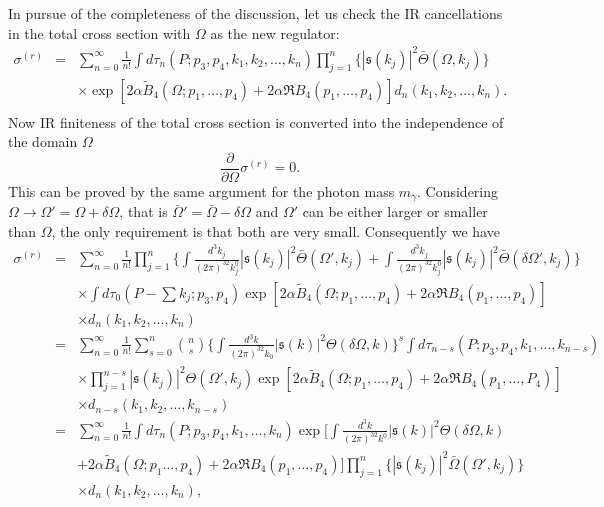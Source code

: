 In pursue of the completeness of the discussion, let us check the IR cancellations in the total cross section with $\Omega$ as the new regulator:
\begin{eqnarray}
\sigma^{(r)}&=&\sum_{n=0}^{\infty}\frac{1}{n!}\int d\tau_n(P;p_3,p_4,k_1,k_2,\ldots,k_n)\prod^n_{j=1}\{|\mathfrak{s}(k_j)|^2\bar{\Theta}(\Omega,k_j)\}\nonumber\\
&&\times\exp\left[2\alpha\widetilde{B}_4(\Omega;p_1,\ldots,p_4)+2\alpha\Re B_4(p_1,\ldots,p_4)\right]d_n(k_1,k_2,\ldots,k_n).\nonumber\\
\end{eqnarray}
Now IR finiteness of the total cross section is converted into the independence of the domain $\Omega$
\begin{equation}
\frac{\partial}{\partial\Omega}\sigma^{(r)}=0.
\end{equation}
This can be proved by the same argument for the photon mass $m_\gamma$. Considering $\Omega\to\Omega'=\Omega+\delta\Omega$, that is $\bar{\Omega}'=\bar{\Omega}-\delta\Omega$ and $\Omega'$ 
can be either larger or smaller than $\Omega$, the only requirement is that both are very small. Consequently we have 
\begin{eqnarray}
\sigma^{(r)}&=&\sum_{n=0}^{\infty}\frac{1}{n!}\prod_{j=1}^{n}\biggl\{ \int\frac{d^3k_j}{(2\pi)^32k^0_j}|\mathfrak{s}(k_j)|^2\bar{\Theta}(\Omega',k_j)+\int\frac{d^3k_j}{(2\pi)^32k^0_j}|\mathfrak{s}(k_j)|^2\bar{\Theta}(\delta\Omega',k_j)  \biggr\}\nonumber\\
&&\times\int d\tau_0\left(P-\sum k_j;p_3,p_4\right)\exp[2\alpha\widetilde{B}_4(\Omega;p_1,\ldots,p_4)+2\alpha\Re B_4(p_1,\ldots,p_4)]\nonumber\\
&&\times d_n(k_1,k_2,\ldots,k_n)\nonumber\\
&=&\sum_{n=0}^{\infty}\frac{1}{n!}\sum_{s=0}^{n}\binom{n}{s}\biggl\{ \int\frac{d^3k}{(2\pi)^32k_0}|\mathfrak{s}(k)|^2\Theta(\delta\Omega,k) \biggr\}^s\int d\tau_{n-s}(P;p_3,p_4,k_1,\ldots,k_{n-s})\nonumber\\
&&\times\prod_{j=1}^{n-s}{|\mathfrak{s}(k_j)|^2\Theta(\Omega',k_j)}\exp[2\alpha\widetilde{B}_4(\Omega;p_1,\ldots,p_4)+2\alpha\Re B_4(p_1,\ldots,P_4)]\nonumber\\
&&\times d_{n-s}(k_1,k_2,\ldots,k_{n-s})\nonumber\\
&=&\sum_{n=0}^{\infty}\frac{1}{n!}\int d\tau_n(P;p_3,p_4,k_1,\ldots,k_n)\exp\biggl[ \int\frac{d^3k}{(2\pi)^32k^0}|\mathfrak{s}(k)|^2\Theta(\delta\Omega,k)\nonumber\\
&&+2\alpha\widetilde{B}_4(\Omega;p_1\ldots,p_4)+2\alpha\Re B_4(p_1,\ldots,p_4) \biggr]\prod_{j=1}^{n}\{|\mathfrak{s}(k_j)|^2\bar{\Omega}(\Omega',k_j)\}\nonumber\\
&&\times d_n(k_1,k_2,\ldots,k_n),
\end{eqnarray}


